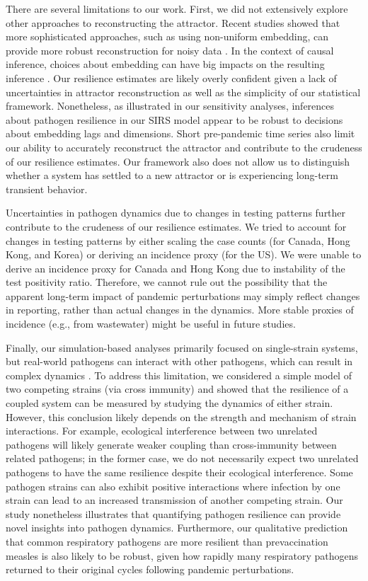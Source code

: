 \documentclass[12pt]{article}
\begin{document}
There are several limitations to our work.
First, we did not extensively explore other approaches to reconstructing the attractor.
Recent studies showed that more sophisticated approaches, such as using non-uniform embedding, can provide more robust reconstruction for noisy data \citep{tan2023selecting}.
In the context of causal inference, choices about embedding can have big impacts on the resulting inference \citep{cobey2016limits}.
Our resilience estimates are likely overly confident given a lack of uncertainties in attractor reconstruction as well as the simplicity of our statistical framework.
Nonetheless, as illustrated in our sensitivity analyses, inferences about pathogen resilience in our SIRS model appear to be robust to decisions about embedding lags and dimensions.
Short pre-pandemic time series also limit our ability to accurately reconstruct the attractor and contribute to the crudeness of our resilience estimates.
Our framework also does not allow us to distinguish whether a system has settled to a new attractor or is experiencing long-term transient behavior.

Uncertainties in pathogen dynamics due to changes in testing patterns further contribute to the crudeness of our resilience estimates.
We tried to account for changes in testing patterns by either scaling the case counts (for Canada, Hong Kong, and Korea) or deriving an incidence proxy (for the US).
We were unable to derive an incidence proxy for Canada and Hong Kong due to instability of the test positivity ratio.
Therefore, we cannot rule out the possibility that the apparent long-term impact of pandemic perturbations may simply reflect changes in reporting, rather than actual changes in the dynamics.
More stable proxies of incidence (e.g., from wastewater) might be useful in future studies.

Finally, our simulation-based analyses primarily focused on single-strain systems, but real-world pathogens can interact with other pathogens, which can result in complex dynamics \citep{rohani2003ecological,nickbakhsh2019virus}.
To address this limitation, we considered a simple model of two competing strains (via cross immunity) and showed that the resilience of a coupled system can be measured by studying the dynamics of either strain. 
However, this conclusion likely depends on the strength and mechanism of strain interactions.
For example, ecological interference between two unrelated pathogens \citep{rohani2003ecological} will likely generate weaker coupling than cross-immunity between related pathogens;
in the former case, we do not necessarily expect two unrelated pathogens to have the same resilience despite their ecological interference.
Some pathogen strains can also exhibit positive interactions where infection by one strain can lead to an increased transmission of another competing strain.
Our study nonetheless illustrates that quantifying pathogen resilience can provide novel insights into pathogen dynamics.
Furthermore, our qualitative prediction that common respiratory pathogens are more resilient than prevaccination measles is also likely to be robust, given how rapidly many respiratory pathogens returned to their original cycles following pandemic perturbations.
\end{document}
